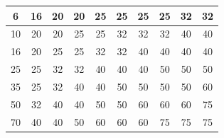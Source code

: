 \begin{table}[h]
\begin{tabular}{|c|c|c|c|c|c|c|c|c|c|}
6                                                                                   & 16                       & 20                       & 20                       & 25                       & 25                                               & 25                       & 25                       & 32                       & 32                        \\ \hline
10                                                                                  & 20                       & 20                       & 25                       & 25                       & 32                                               & 32                       & 32                       & 40                       & 40                        \\ \hline
16                                                                                  & 20                       & 25                       & 25                       & 32                       & 32                                               & 40                       & 40                       & 40                       & 40                        \\ \hline
25                                                                                  & 25                       & 32                       & 32                       & 40                       & 40                                               & 40                       & 50                       & 50                       & 50                        \\ \hline
35                                                                                  & 25                       & 32                       & 40                       & 40                       & 50                                               & 50                       & 50                       & 50                       & 60                        \\ \hline
50                                                                                  & 32                       & 40                       & 40                       & 50                       & 50                                               & 60                       & 60                       & 60                       & 75                        \\ \hline
70                                                                                  & 40                       & 40                       & 50                       & 60                       & 60                                               & 60                       & 75                       & 75                       & 75                        \\ \hline

\end{tabular}
\end{table}
